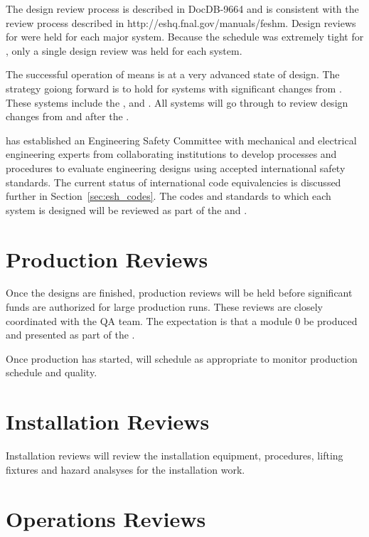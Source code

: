 The  design review process is described in DocDB-9664\cite{bib:docdb9664}
and is consistent with the \fnal review process described in
http://eshq.fnal.gov/manuals/feshm. Design reviews for  were held for each
major system. Because the schedule was extremely tight for , only a single design review
was held for each system.

The successful operation of  means  is at
a very advanced state of design. The strategy goiong forward is to
hold  for systems with significant changes from
. These systems include the ,  and
. All systems will go through  to review
design changes from  and  after the
.

 has established an Engineering Safety Committee with
mechanical and electrical engineering experts from collaborating
institutions to develop processes and procedures to evaluate engineering designs using accepted international safety
standards. The current status of international code equivalencies is
discussed further in Section~\ref{sec:esh_codes}. The codes and
standards to which each system is designed will be reviewed as part of
the  and .

\section{Production Reviews}

Once the designs are finished, production reviews will be held
before significant funds are authorized for large production
runs. These reviews are closely coordinated with the QA team. The
expectation is that a module 0 be produced and presented as part of the .

Once production has started,  will schedule 
as appropriate to monitor production schedule and quality.

\section{Installation Reviews}

Installation reviews will review the  installation
equipment, procedures, lifting fixtures and hazard analsyses for the
installation work.

\section{Operations Reviews}

